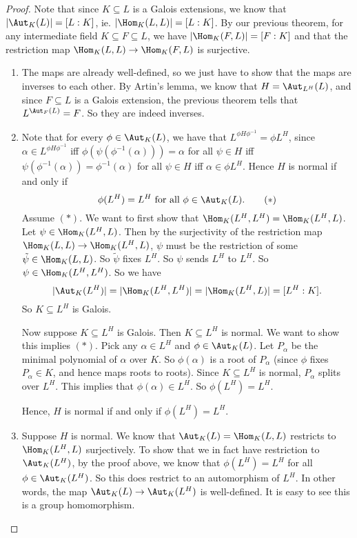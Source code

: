 \documentclass[a4paper]{article}
\begin{document}
\begin{proof}\leavevmode
  Note that since $K\subseteq L$ is a Galois extensions, we know that $|\Aut_K(L)| = [L:K]$, ie. $|\Hom_K(L, L)| = [L:K]$. By our previous theorem, for any intermediate field $K\subseteq F \subseteq L$, we have $|\Hom_K(F, L)| = [F:K]$ and that the restriction map $\Hom_K(L, L) \to \Hom_K(F, L)$ is surjective.

  \begin{enumerate}
    \item The maps are already well-defined, so we just have to show that the maps are inverses to each other. By Artin's lemma, we know that $H = \Aut_{L^H}(L)$, and since $F\subseteq L$ is a Galois extension, the previous theorem tells that $L^{\Aut_F (L)} = F$. So they are indeed inverses.
    \item Note that for every $\phi \in \Aut_K(L)$, we have that $L^{\phi H \phi^{-1}} = \phi L^H$, since $\alpha \in L^{\phi H \phi^{-1}}$ iff $\phi (\psi (\phi^{-1} (\alpha))) = \alpha$ for all $\psi \in H$ iff $\psi (\phi^{-1}(\alpha)) = \phi^{-1}(\alpha)$ for all $\psi \in H$ iff $\alpha \in \phi L^H$. Hence $H$ is normal if and only if
      \[
        \phi(L^H) = L^H\text{ for all }\phi \in \Aut_K(L).\tag{$*$}
      \]
      Assume $(*)$. We want to first show that $\Hom_K(L^H, L^H) = \Hom_K(L^H, L)$. Let $\psi \in \Hom_K(L^H, L)$. Then by the surjectivity of the restriction map $\Hom_K(L, L) \to \Hom_K(L^H, L)$, $\psi$ must be the restriction of some $\tilde{\psi} \in \Hom_K(L, L)$. So $\tilde{\psi}$ fixes $L^H$. So $\psi$ sends $L^H$ to $L^H$. So $\psi \in \Hom_K(L^H, L^H)$. So we have
      \[
        |\Aut_K(L^H)| = |\Hom_K(L^H, L^H)| = |\Hom_K(L^H, L)| = [L^H:K].
      \]
      So $K\subseteq L^H$ is Galois.

      Now suppose $K\subseteq L^H$ is Galois. Then $K\subseteq L^H$ is normal. We want to show this implies $(*)$. Pick any $\alpha \in L^H$ and $\phi\in \Aut_K(L)$. Let $P_\alpha$ be the minimal polynomial of $\alpha$ over $K$. So $\phi(\alpha)$ is a root of $P_\alpha$ (since $\phi$ fixes $P_\alpha \in K$, and hence maps roots to roots). Since $K\subseteq L^H$ is normal, $P_\alpha$ splits over $L^H$. This implies that $\phi(\alpha) \in L^H$. So $\phi(L^H) = L^H$.

      Hence, $H$ is normal if and only if $\phi(L^H) = L^H$.
    \item Suppose $H$ is normal. We know that $\Aut_K(L) = \Hom_K(L, L)$ restricts to $\Hom_K(L^H, L)$ surjectively. To show that we in fact have restriction to $\Aut_K(L^H)$, by the proof above, we know that $\phi(L^H) = L^H$ for all $\phi \in \Aut_K(L^H)$. So this does restrict to an automorphism of $L^H$. In other words, the map $\Aut_K(L) \to \Aut_K(L^H)$ is well-defined. It is easy to see this is a group homomorphism.


\end{enumerate}
\end{proof}
\end{document}
